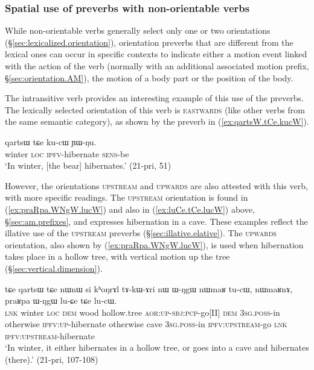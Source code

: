 \subsubsection{Spatial use of preverbs with non-orientable verbs} \label{sec:orientation.position}
While non-orientable verbs generally select only one or two orientations (§\ref{sec:lexicalized.orientation}), orientation preverbs that are different from the lexical ones can occur in specific contexts to indicate either a motion event linked with the action of the verb (normally with an additional associated motion prefix, §\ref{sec:orientation.AM}), the motion of a body part or the position of the body. 

The intransitive verb  provides an interesting example of this use of the preverbs. The lexically selected orientation of this verb is \textsc{eastwards} (like other verbs from the same semantic category), as shown by the preverb  in (\ref{ex:qartsW.tCe.kucW}).

\begin{exe}
\ex \label{ex:qartsW.tCe.kucW}
\gll  qartsɯ tɕe ku-cɯ ɲɯ-ŋu. \\
winter \textsc{loc} \textsc{ipfv}-hibernate \textsc{sens}-be \\
\glt `In winter, [the bear] hibernates.' (21-pri, 51)
\end{exe}

However, the orientations \textsc{upstream} and \textsc{upwards} are also attested with this verb, with more specific readings. The \textsc{upstream} orientation is found in (\ref{ex:praRpa.WNgW.lucW}) and also in (\ref{ex:luCe.tCe.lucW}) above, §\ref{sec:am.prefixes}, and expresses hibernation in a cave. These examples reflect the illative use of the \textsc{upstream} preverbs (§\ref{sec:illative.elative}). The \textsc{upwards} orientation, also shown by (\ref{ex:praRpa.WNgW.lucW}), is used when hibernation takes place in a hollow tree, with vertical motion up the tree (§\ref{sec:vertical.dimension}).

\begin{exe}
\ex \label{ex:praRpa.WNgW.lucW}
\gll tɕe qartsɯ tɕe nɯnɯ si kʰoŋrɤl tɤ-kɯ-ɤri nɯ ɯ-ŋgɯ nɯmaʁ tu-cɯ, 
nɯmaʁnɤ, praʁpa ɯ-ŋgɯ lu-ɕe tɕe lu-cɯ. \\
\textsc{lnk} winter \textsc{loc} \textsc{dem} wood hollow.tree \textsc{aor}:\textsc{up}-\textsc{sbj}:\textsc{pcp}-go[II] \textsc{dem} \textsc{3sg}.\textsc{poss}-in otherwise \textsc{ipfv}:\textsc{up}-hibernate otherwise cave \textsc{3sg}.\textsc{poss}-in \textsc{ipfv}:\textsc{upstream}-go \textsc{lnk} \textsc{ipfv}:\textsc{upstream}-hibernate \\
\glt `In winter, it either hibernates in a hollow tree, or goes into a cave and hibernates (there).' (21-pri, 107-108)
\end{exe}

